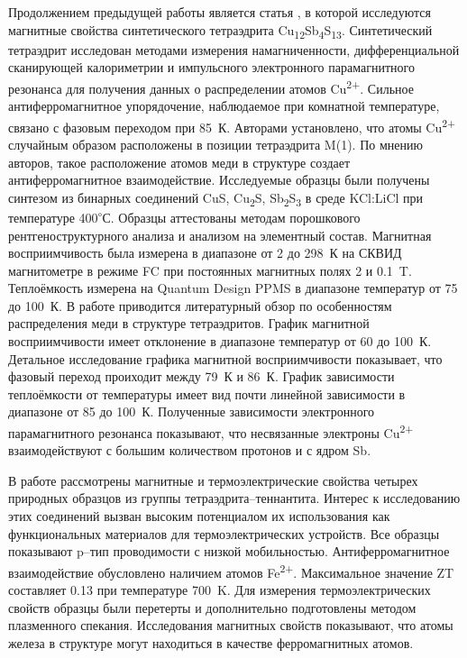 Продолжением предыдущей работы является статья \cite{DiBenedetto2005}, в которой исследуются магнитные свойства синтетического тетраэдрита Cu\textsubscript{12}Sb\textsubscript{4}S\textsubscript{13}. Синтетический тетраэдрит исследован методами измерения намагниченности, дифференциальной сканирующей калориметрии и импульсного электронного парамагнитного резонанса для получения данных о распределении атомов Cu\textsuperscript{2+}.
Сильное антиферромагнитное упорядочение, наблюдаемое при комнатной температуре, связано с фазовым переходом при 85~К. Авторами установлено, что атомы Cu\textsuperscript{2+} случайным образом расположены в позиции тетраэдрита M(1). По мнению авторов, такое расположение атомов меди в структуре создает антиферромагнитное взаимодействие. Исследуемые образцы были получены синтезом из бинарных соединений CuS, Cu\textsubscript{2}S, Sb\textsubscript{2}S\textsubscript{3} в среде KCl:LiCl при температуре 400\textsuperscript{$\circ$}С. Образцы аттестованы методам порошкового рентгеноструктурного анализа и анализом на элементный состав. Магнитная восприимчивость была измерена в диапазоне от 2 до 298~К на СКВИД магнитометре в режиме FC при постоянных магнитных полях 2 и 0.1~T. Теплоёмкость измерена на Quantum Design
PPMS в диапазоне температур от 75 до 100~К. В работе приводится литературный обзор по особенностям распределения меди в структуре тетраэдритов. График магнитной восприимчивости имеет отклонение в диапазоне температур от 60 до 100~К. Детальное исследование графика магнитной восприимчивости показывает, что фазовый переход проиходит между 79~К и 86~К. График зависимости теплоёмкости от температуры имеет вид почти линейной зависимости в диапазоне от 85 до 100~К. Полученные зависимости электронного парамагнитного резонанса показывают, что несвязанные электроны Cu\textsuperscript{2+} взаимодействуют с большим количеством протонов и с ядром Sb.



В работе \cite{Levinsky_2015} рассмотрены магнитные и термоэлектрические свойства четырех природных образцов из группы тетраэдрита--теннантита. Интерес к исследованию этих соединений вызван высоким потенциалом их использования как функциональных материалов для термоэлектрических устройств. Все образцы показывают p--тип проводимости с низкой мобильностью. Антиферромагнитное взаимодействие обусловлено наличием атомов Fe\textsuperscript{2+}. Максимальное значение ZT составляет 0.13 при температуре 700~K. Для измерения термоэлектрических свойств образцы были перетерты и дополнительно подготовлены методом плазменного спекания. Исследования магнитных свойств показывают, что  атомы железа в структуре могут находиться в качестве ферромагнитных атомов.

